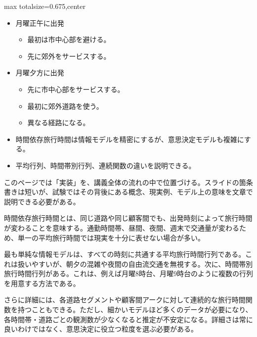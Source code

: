 \clearpage
{}
\begin{adjustbox}{max totalsize={\textwidth}{0.675\textheight},center}
\begin{minipage}{\textwidth}\scriptsize
\begin{minipage}[t]{0.485\textwidth}
\begin{itemize}
\item 月曜正午に出発
\begin{itemize}
\item 最初は市中心部を避ける。
\item 先に郊外をサービスする。
\end{itemize}
\item 月曜夕方に出発
\begin{itemize}
\item 先に市中心部をサービスする。
\item 最初に郊外道路を使う。
\item 異なる経路になる。
\end{itemize}
\end{itemize}
\begin{itemize}
\item 時間依存旅行時間は情報モデルを精密にするが、意思決定モデルも複雑にする。
\item 平均行列、時間帯別行列、連続関数の違いを説明できる。
\end{itemize}
\end{minipage}\hfill
\begin{minipage}[t]{0.485\textwidth}
このページでは「実装」を、講義全体の流れの中で位置づける。スライドの箇条書きは短いが、試験ではその背後にある概念、現実例、モデル上の意味を文章で説明できる必要がある。\par
時間依存旅行時間とは、同じ道路や同じ顧客間でも、出発時刻によって旅行時間が変わることを意味する。通勤時間帯、昼間、夜間、週末で交通量が変わるため、単一の平均旅行時間では現実を十分に表せない場合が多い。\par
最も単純な情報モデルは、すべての時刻に共通する平均旅行時間行列である。これは扱いやすいが、朝夕の混雑や夜間の自由流交通を無視する。次に、時間帯別旅行時間行列がある。これは、例えば月曜8時台、月曜9時台のように複数の行列を用意する方法である。\par
さらに詳細には、各道路セグメントや顧客間アークに対して連続的な旅行時間関数を持つこともできる。ただし、細かいモデルほど多くのデータが必要になり、各時間帯・道路ごとの観測数が少なくなると推定が不安定になる。詳細さは常に良いわけではなく、意思決定に役立つ粒度を選ぶ必要がある。\par

\end{minipage}
\end{minipage}
\end{adjustbox}
